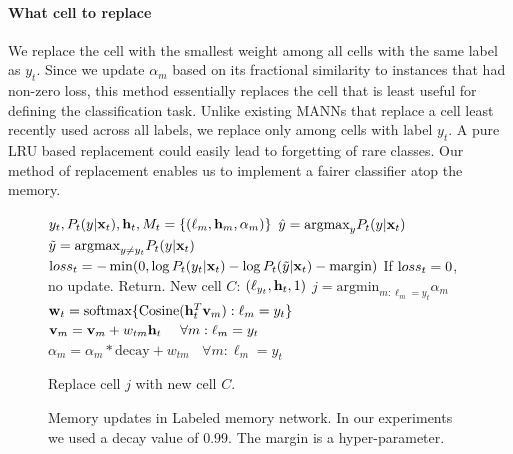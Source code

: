 \documentclass[letterpaper]{article} %
\newcommand{\vek}[1]{{\bf {#1}}}
\newcommand{\vx}{{\vek{x}}}
\newcommand{\vw}{{\vek{w}}}
\newcommand{\vh}{{\vek{h}}}
\newcommand{\vM}{{\vek{v}}}
\newcommand{\argmax}{{\text{argmax}}}
\newcommand{\argmin}{{\text{argmin}}}
\newcommand{\loss}{{\text loss}}
\def\shiv#1{\todo [color=orange]{Shiv: #1}}
\begin{document}
\paragraph{What cell to replace} We replace the cell with the smallest weight among all cells with the same label as $y_t$. %
Since we update $\alpha_m$ based on its fractional similarity to instances that had non-zero loss, this method essentially replaces the cell that is least useful for defining the classification task.  Unlike existing MANNs that replace a cell least recently used across all labels, we replace only among cells with label $y_t$. A pure LRU based replacement could easily lead to forgetting of rare classes.  Our method of replacement enables us to implement a fairer classifier atop the memory. 

\begin{figure}
\begin{center}
\begin{algorithmic}
   $y_t, P_t(y|\vx_t), \vh_t, M_t = \{(\ell_m, \vh_m, \alpha_m)\}$
  \STATE $\hat{y} = \argmax_y P_t(y|\vx_t)$
  \STATE $\tilde{y} = \argmax_{y \neq y_t} P_t(y|\vx_t)$
  \STATE $\loss_t = - \min(0, \log P_t(y_t|\vx_t) - \log P_t(\tilde{y}|\vx_t) - \text{margin} )$
  \STATE If $\loss_t=0$, no update. Return.
  \STATE New cell $C$: $(\ell_{y_t}, \vh_t, 1)$
  \STATE $j = \argmin_{m:\ell_m = y_t} \alpha_m$
  \STATE $\vw_t = \text{softmax}\{\text{Cosine}(\vh_t^T \vM_m) :\ell_m = y_t\}$
  \STATE $\vM_{m} = \vM_{m} + w_{tm}{\vh_t}~~~~\forall m: \ell_m = y_t$
  \STATE $\alpha_{m} = \alpha_m*\text{decay} + w_{tm}~~~~\forall m: \ell_m = y_t$

  \STATE Replace cell $j$ with new cell $C$.
  \ENDIF
\end{algorithmic}
\caption{\label{alg-write}Memory updates in Labeled memory network. In our experiments we used a decay value of 0.99.   The margin is a hyper-parameter.}
\end{center}
\end{figure}
\end{document}
